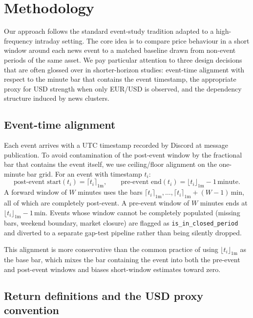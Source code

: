 \section{Methodology}
\label{sec:methodology}

Our approach follows the standard event-study tradition
\citep{mackinlay1997event} adapted to a high-frequency intraday
setting. The core idea is to compare price behaviour in a short
window around each news event to a matched baseline drawn from
non-event periods of the same asset. We pay particular attention to
three design decisions that are often glossed over in shorter-horizon
studies: event-time alignment with respect to the minute bar that
contains the event timestamp, the appropriate proxy for USD strength
when only EUR/USD is observed, and the dependency structure induced
by news clusters.

\subsection{Event-time alignment}
\label{ssec:event-time-alignment}

Each event arrives with a UTC timestamp recorded by Discord at
message publication. To avoid contamination of the post-event
window by the fractional bar that contains the event itself, we use
ceiling/floor alignment on the one-minute bar grid. For an event with
timestamp $t_i$:
\begin{equation}
\text{post-event start}(t_i) = \lceil t_i \rceil_{1\text{m}},
\qquad
\text{pre-event end}(t_i) = \lfloor t_i \rfloor_{1\text{m}} - 1\,\text{minute}.
\label{eq:alignment}
\end{equation}
A forward window of $W$ minutes uses the bars
$\lceil t_i \rceil_{1\text{m}}, \ldots, \lceil t_i \rceil_{1\text{m}} + (W{-}1)\,\text{min}$,
all of which are completely post-event. A pre-event window of $W$
minutes ends at $\lfloor t_i \rfloor_{1\text{m}} - 1\,\text{min}$.
Events whose window cannot be completely populated (missing bars,
weekend boundary, market closure) are flagged as
\texttt{is\_in\_closed\_period} and diverted to a separate gap-test
pipeline rather than being silently dropped.

This alignment is more conservative than the common practice of
using $\lfloor t_i \rfloor_{1\text{m}}$ as the base bar, which mixes
the bar containing the event into both the pre-event and post-event
windows and biases short-window estimates toward zero.

\subsection{Return definitions and the USD proxy convention}
\label{ssec:returns-and-usd-proxy}

